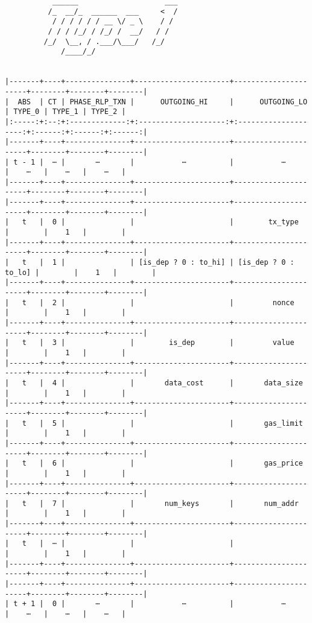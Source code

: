 \documentclass[varwidth=\maxdimen,margin=0.5cm,multi={verbatim}]{standalone}
\begin{document}
\begin{verbatim}
           ______                    ___
          /_  __/_  ______  ___     <  /
           / / / / / / __ \/ _ \    / / 
          / / / /_/ / /_/ /  __/   / /  
         /_/  \__, / .___/\___/   /_/   
             /____/_/


|-------+----+---------------+----------------------+----------------------+--------+--------+--------|
|  ABS  | CT | PHASE_RLP_TXN |      OUTGOING_HI     |      OUTGOING_LO     | TYPE_0 | TYPE_1 | TYPE_2 |
|:-----:+:--:+:-------------:+:--------------------:+:--------------------:+:------:+:------:+:------:|
|-------+----+---------------+----------------------+----------------------+--------+--------+--------|
| t - 1 |  ⋯ |       ⋯       |           ⋯          |           ⋯          |    ⋯   |    ⋯   |    ⋯   |
|-------+----+---------------+----------------------+----------------------+--------+--------+--------|
|-------+----+---------------+----------------------+----------------------+--------+--------+--------|
|   t   |  0 |               |                      |        tx_type       |        |    1   |        |
|-------+----+---------------+----------------------+----------------------+--------+--------+--------|
|   t   |  1 |               | [is_dep ? 0 : to_hi] | [is_dep ? 0 : to_lo] |        |    1   |        |
|-------+----+---------------+----------------------+----------------------+--------+--------+--------|
|   t   |  2 |               |                      |         nonce        |        |    1   |        |
|-------+----+---------------+----------------------+----------------------+--------+--------+--------|
|   t   |  3 |               |        is_dep        |         value        |        |    1   |        |
|-------+----+---------------+----------------------+----------------------+--------+--------+--------|
|   t   |  4 |               |       data_cost      |       data_size      |        |    1   |        |
|-------+----+---------------+----------------------+----------------------+--------+--------+--------|
|   t   |  5 |               |                      |       gas_limit      |        |    1   |        |
|-------+----+---------------+----------------------+----------------------+--------+--------+--------|
|   t   |  6 |               |                      |       gas_price      |        |    1   |        |
|-------+----+---------------+----------------------+----------------------+--------+--------+--------|
|   t   |  7 |               |       num_keys       |       num_addr       |        |    1   |        |
|-------+----+---------------+----------------------+----------------------+--------+--------+--------|
|   t   |  ⋯ |               |                      |                      |        |    1   |        |
|-------+----+---------------+----------------------+----------------------+--------+--------+--------|
|-------+----+---------------+----------------------+----------------------+--------+--------+--------|
| t + 1 |  0 |       ⋯       |           ⋯          |           ⋯          |    ⋯   |    ⋯   |    ⋯   |




\end{verbatim}
\end{document}

